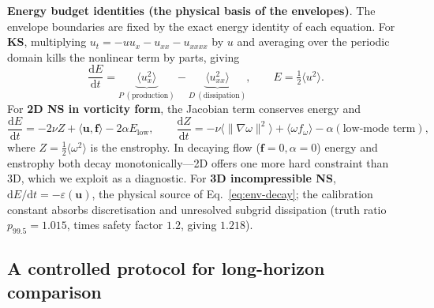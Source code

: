 \documentclass[11pt,a4paper]{article}
\newcommand{\bu}{\bm{u}}
\newcommand{\Ex}{E}
\newcommand{\inner}[2]{\langle #1, #2 \rangle}
\begin{document}
\textbf{Energy budget identities (the physical basis of the envelopes)}. The envelope boundaries are fixed by the exact energy identity of each equation. For \textbf{KS}, multiplying $u_t=-uu_x-u_{xx}-u_{xxxx}$ by $u$ and averaging over the periodic domain kills the nonlinear term by parts, giving
\begin{equation}
\frac{\mathrm{d}\Ex}{\mathrm{d}t}=\underbrace{\langle u_x^2\rangle}_{P\ (\text{production})}-\underbrace{\langle u_{xx}^2\rangle}_{D\ (\text{dissipation})},\qquad \Ex=\tfrac12\langle u^2\rangle .
\label{eq:ks-budget}
\end{equation}
For \textbf{2D NS in vorticity form}, the Jacobian term conserves energy and
\begin{equation}
\frac{\mathrm{d}\Ex}{\mathrm{d}t}=-2\nu Z+\inner{\bu}{\bm f}-2\alpha\Ex_{\mathrm{low}},\qquad
\frac{\mathrm{d}Z}{\mathrm{d}t}=-\nu\langle\|\nabla\omega\|^2\rangle+\langle\omega f_\omega\rangle-\alpha(\text{low-mode term}),
\label{eq:ns2d-budget}
\end{equation}
where $Z=\tfrac12\langle\omega^2\rangle$ is the enstrophy. In decaying flow ($\bm f{=}0,\alpha{=}0$) energy and enstrophy both decay monotonically---2D offers one more hard constraint than 3D, which we exploit as a diagnostic. For \textbf{3D incompressible NS}, $\mathrm{d}\Ex/\mathrm{d}t=-\varepsilon(\bu)$, the physical source of Eq.~\eqref{eq:env-decay}; the calibration constant absorbs discretisation and unresolved subgrid dissipation (truth ratio $p_{99.5}=1.015$, times safety factor $1.2$, giving $1.218$).

\subsection{A controlled protocol for long-horizon comparison}\label{sec:setup}
\end{document}
